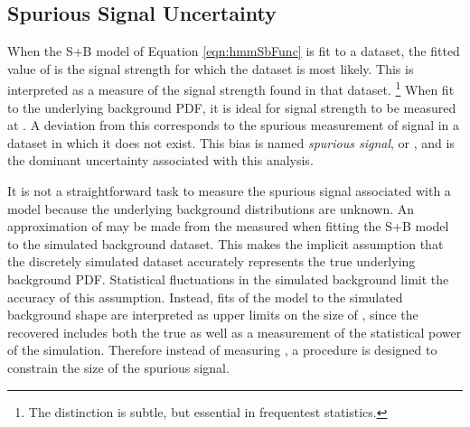 \subsection{Spurious Signal Uncertainty}

When the S+B model of Equation \ref{eqn:hmmSbFunc} is fit to a dataset, the fitted value of \mus is the signal strength for which the dataset is most likely.
This is interpreted as a measure of the signal strength found in that dataset. 
\footnote{The distinction is subtle, but essential in frequentest statistics.}
When fit to the underlying background PDF, it is ideal for signal strength to be measured at .
A deviation from this corresponds to the spurious measurement of signal in a dataset in which it does not exist.
This bias is named \emph{spurious signal}, or \nss, and is the dominant uncertainty associated with this analysis.

It is not a straightforward task to measure the spurious signal associated with a model because the underlying background distributions are unknown. 
An approximation of \nss may be made from the \mus measured when fitting the S+B model to the simulated background dataset.
This makes the implicit assumption that the discretely simulated dataset accurately represents the true underlying background PDF.
Statistical fluctuations in the simulated background limit the accuracy of this assumption.
Instead, fits of the model to the simulated background shape are interpreted as upper limits on the size of \nss, since the recovered \mus includes both the true \nss as well as a measurement of the statistical power of the simulation.
Therefore instead of measuring \nss, a procedure is designed to constrain the size of the spurious signal. 

